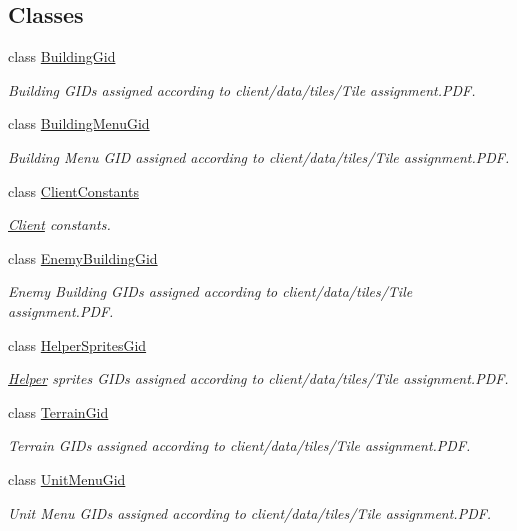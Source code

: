 \subsection*{Classes}
\begin{DoxyCompactItemize}
\item 
class \hyperlink{classClient_1_1Common_1_1Constants_1_1BuildingGid}{Building\+Gid}
\begin{DoxyCompactList}\small\item\em Building G\+I\+Ds assigned according to \textquotesingle{}client/data/tiles/\+Tile assignment.\+P\+D\+F\textquotesingle{}. \end{DoxyCompactList}\item 
class \hyperlink{classClient_1_1Common_1_1Constants_1_1BuildingMenuGid}{Building\+Menu\+Gid}
\begin{DoxyCompactList}\small\item\em Building Menu G\+I\+D assigned according to \textquotesingle{}client/data/tiles/\+Tile assignment.\+P\+D\+F\textquotesingle{}. \end{DoxyCompactList}\item 
class \hyperlink{classClient_1_1Common_1_1Constants_1_1ClientConstants}{Client\+Constants}
\begin{DoxyCompactList}\small\item\em \hyperlink{namespaceClient}{Client} constants. \end{DoxyCompactList}\item 
class \hyperlink{classClient_1_1Common_1_1Constants_1_1EnemyBuildingGid}{Enemy\+Building\+Gid}
\begin{DoxyCompactList}\small\item\em Enemy Building G\+I\+Ds assigned according to \textquotesingle{}client/data/tiles/\+Tile assignment.\+P\+D\+F\textquotesingle{}. \end{DoxyCompactList}\item 
class \hyperlink{classClient_1_1Common_1_1Constants_1_1HelperSpritesGid}{Helper\+Sprites\+Gid}
\begin{DoxyCompactList}\small\item\em \hyperlink{namespaceClient_1_1Common_1_1Helper}{Helper} sprites G\+I\+Ds assigned according to \textquotesingle{}client/data/tiles/\+Tile assignment.\+P\+D\+F\textquotesingle{}. \end{DoxyCompactList}\item 
class \hyperlink{classClient_1_1Common_1_1Constants_1_1TerrainGid}{Terrain\+Gid}
\begin{DoxyCompactList}\small\item\em Terrain G\+I\+Ds assigned according to \textquotesingle{}client/data/tiles/\+Tile assignment.\+P\+D\+F\textquotesingle{}. \end{DoxyCompactList}\item 
class \hyperlink{classClient_1_1Common_1_1Constants_1_1UnitMenuGid}{Unit\+Menu\+Gid}
\begin{DoxyCompactList}\small\item\em Unit Menu G\+I\+Ds assigned according to \textquotesingle{}client/data/tiles/\+Tile assignment.\+P\+D\+F\textquotesingle{}. \end{DoxyCompactList}\end{DoxyCompactItemize}
